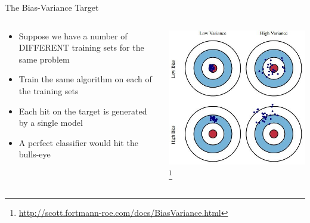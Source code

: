 \documentclass[aspectratio=169]{beamer}
\begin{document}
\begin{frame}{The Bias-Variance Target}

\begin{columns}
\begin{column}{0.5\textwidth}
\begin{itemize}
\item Suppose we have a number of DIFFERENT training sets for the same problem
\item Train the same algorithm on each of the training sets
\item Each hit on the target is generated by a single model
\item A perfect classifier would hit the bulls-eye
\end{itemize}
\end{column}
\begin{column}{0.5\textwidth}
\includegraphics[width=1\textwidth]{./lectReg/bias-and-variance.jpg}
\footnote{\url{http://scott.fortmann-roe.com/docs/BiasVariance.html}}
\end{column}
\end{columns}
\end{frame}
\end{document}
